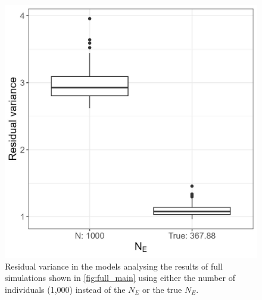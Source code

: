 \documentclass[12pt]{article}
\begin{document}
\begin{bibunit}


\newpage
\begin{figure}[H]
\centering
\includegraphics[scale = 0.15]{Figures/residual_var_NE.jpg}
\caption{Residual variance in the models analysing the results of full simulations shown in \ref{fig:full_main} using either the number of individuals (1,000) instead of the $N_E$ or the true $N_E$.}
  \label{fig:residual_var_NE}
\end{figure}


\end{bibunit}
\end{document}

